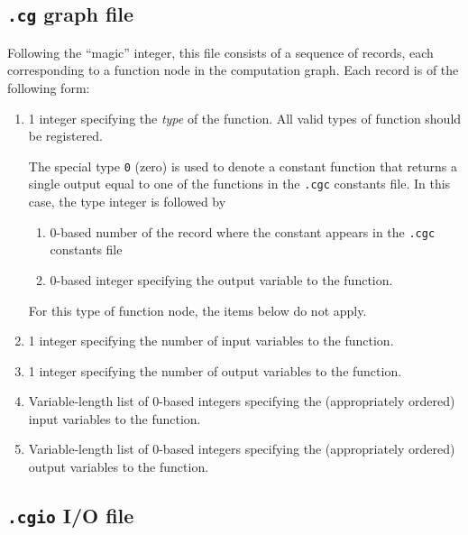 \documentclass[11pt]{article}
\begin{document}
\subsection{\texttt{.cg} graph file}

Following the ``magic'' integer, this file consists of a sequence of
records, each corresponding to a function node in the computation
graph. Each record is of the following form:
\begin{enumerate}
\item 1 integer specifying the \emph{type} of the function. All valid
  types of function should be registered.

  The special type \texttt{0} (zero) is used to denote a constant
  function that returns a single output equal to one of the functions
  in the \texttt{.cgc} constants file. In this case, the type integer
  is followed by
  \begin{enumerate}
  \item 0-based number of the record where the constant appears in the
    \texttt{.cgc} constants file
  \item 0-based integer specifying the output variable to the
    function.
  \end{enumerate}
  For this type of function node, the items below do not apply.

\item 1 integer specifying the number of input variables to the
  function. 

\item 1 integer specifying the number of output variables to the
  function.

\item Variable-length list of 0-based integers specifying the (appropriately
  ordered) input variables to the function. 

\item Variable-length list of 0-based integers specifying the
  (appropriately ordered) output variables to the function.
\end{enumerate}



\subsection{\texttt{.cgio} I/O file}
\end{document}
